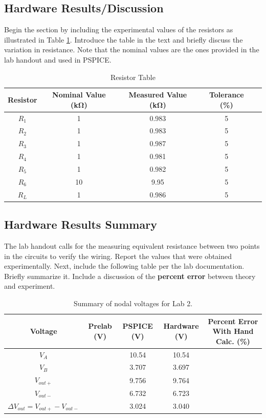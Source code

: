 \documentclass[11pt]{article}
\begin{document}
\subsection{Hardware Results/Discussion}	
  Begin the section by including the experimental values of the resistors as illustrated in Table \ref{Table:Lab2Resistors}. Introduce the table in the text and briefly discuss the variation in resistance. Note that the nominal values are the ones provided in the lab handout and used in PSPICE.   
  	\begin{table}[h!]
  		\centering
  		\caption{Resistor Table}
  		\label{Table:Lab2Resistors}
  		\begin{tabular}{|c||c|c|c|c|}
  			\hline
  			Resistor & Nominal Value (\si{\kilo\ohm})& Measured Value (\si{\kilo\ohm}) & Tolerance (\si{\percent})   \\
  			\hline
  			$R_1$ & 1 & 0.983 & 5  \\	 \hline 
  			$R_2$ & 1 & 0.983 & 5 \\	 \hline 
  			$R_3$ & 1 & 0.987 & 5 \\	 \hline 
  			$R_4$ & 1 & 0.981 & 5 \\	 \hline 
  			$R_5$ & 1 & 0.982 & 5 \\	 \hline 
  			$R_6$ & 10 & 9.95 & 5 \\	 \hline
  			$R_L$ & 1 &  0.986 & 5 \\	 \hline 
  		\end{tabular}
  	\end{table}

  	
\subsection{Hardware Results Summary}
The lab handout calls for the measuring equivalent resistance between two points in the circuits to verify the wiring.  Report the values that were obtained experimentally.  Next, include the following table per the lab documentation. Briefly summarize it. Include a discussion of the \textbf{percent error} between theory and experiment.  
	\begin{table}[h!]
		\centering
		\caption{Summary of nodal voltages for Lab 2.}
		\label{Table:Lab2DCVoltages}
		\begin{tabular}{|c||c|c|c|c|}
			\hline
			Voltage & Prelab (\si{\volt}) &  PSPICE (\si{\volt})& Hardware (\si{\volt}) & Percent Error With Hand Calc. (\si{\percent})   \\
			\hline
			$V_A$ & & 10.54 & 10.54 &\\	 \hline 
			$V_B$ & & 3.707 & 3.697 & \\	 \hline 
			$V_{out+}$ & & 9.756 & 9.764 &  \\	 \hline
			$V_{out-}$ & & 6.732 & 6.723 & \\	 \hline 
			$\Delta V_{out}=V_{out+}-V_{out-}$ &  & 3.024 & 3.040 &  \\	 \hline
		\end{tabular}
	\end{table}
	
\end{document}
